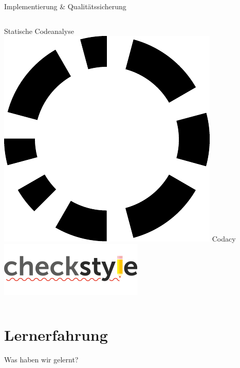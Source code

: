 \documentclass[xcolor=dvipsnames]{beamer}
\begin{document}
\begin{frame}{Implementierung \& Qualitätssicherung}
\begin{columns}
\begin{column}{0.5\textwidth}
\begin{block}{Statische Codeanalyse}
                    \includegraphics[width=(\textwidth / 4)]{img/codacy.pdf}
                    Codacy\\
                    \includegraphics[width=(\textwidth / 2)]{img/checkstyle.png}
                \end{block}
            \end{column}
        \end{columns}
    \end{frame}
    \section{Lernerfahrung}
    \begin{frame}[c]
        \begin{center}
            \Huge Was haben wir gelernt?
        \end{center}
    \end{frame}
\end{document}
